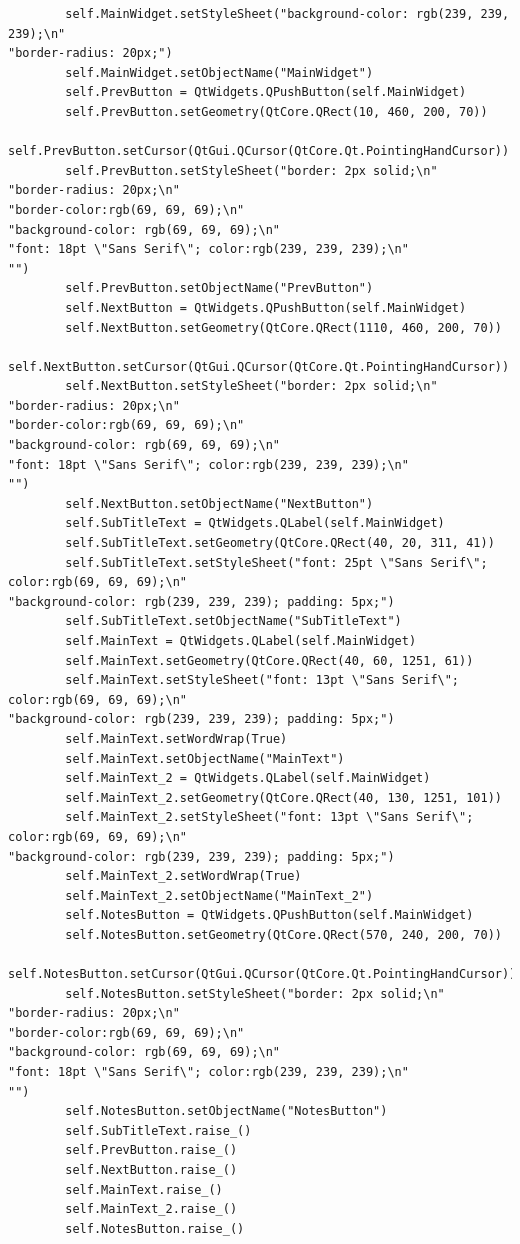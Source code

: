 \documentclass[12pt]{article}
\begin{document}
\begin{lstlisting}
        self.MainWidget.setStyleSheet("background-color: rgb(239, 239, 239);\n"
"border-radius: 20px;")
        self.MainWidget.setObjectName("MainWidget")
        self.PrevButton = QtWidgets.QPushButton(self.MainWidget)
        self.PrevButton.setGeometry(QtCore.QRect(10, 460, 200, 70))
        self.PrevButton.setCursor(QtGui.QCursor(QtCore.Qt.PointingHandCursor))
        self.PrevButton.setStyleSheet("border: 2px solid;\n"
"border-radius: 20px;\n"
"border-color:rgb(69, 69, 69);\n"
"background-color: rgb(69, 69, 69);\n"
"font: 18pt \"Sans Serif\"; color:rgb(239, 239, 239);\n"
"")
        self.PrevButton.setObjectName("PrevButton")
        self.NextButton = QtWidgets.QPushButton(self.MainWidget)
        self.NextButton.setGeometry(QtCore.QRect(1110, 460, 200, 70))
        self.NextButton.setCursor(QtGui.QCursor(QtCore.Qt.PointingHandCursor))
        self.NextButton.setStyleSheet("border: 2px solid;\n"
"border-radius: 20px;\n"
"border-color:rgb(69, 69, 69);\n"
"background-color: rgb(69, 69, 69);\n"
"font: 18pt \"Sans Serif\"; color:rgb(239, 239, 239);\n"
"")
        self.NextButton.setObjectName("NextButton")
        self.SubTitleText = QtWidgets.QLabel(self.MainWidget)
        self.SubTitleText.setGeometry(QtCore.QRect(40, 20, 311, 41))
        self.SubTitleText.setStyleSheet("font: 25pt \"Sans Serif\"; color:rgb(69, 69, 69);\n"
"background-color: rgb(239, 239, 239); padding: 5px;")
        self.SubTitleText.setObjectName("SubTitleText")
        self.MainText = QtWidgets.QLabel(self.MainWidget)
        self.MainText.setGeometry(QtCore.QRect(40, 60, 1251, 61))
        self.MainText.setStyleSheet("font: 13pt \"Sans Serif\"; color:rgb(69, 69, 69);\n"
"background-color: rgb(239, 239, 239); padding: 5px;")
        self.MainText.setWordWrap(True)
        self.MainText.setObjectName("MainText")
        self.MainText_2 = QtWidgets.QLabel(self.MainWidget)
        self.MainText_2.setGeometry(QtCore.QRect(40, 130, 1251, 101))
        self.MainText_2.setStyleSheet("font: 13pt \"Sans Serif\"; color:rgb(69, 69, 69);\n"
"background-color: rgb(239, 239, 239); padding: 5px;")
        self.MainText_2.setWordWrap(True)
        self.MainText_2.setObjectName("MainText_2")
        self.NotesButton = QtWidgets.QPushButton(self.MainWidget)
        self.NotesButton.setGeometry(QtCore.QRect(570, 240, 200, 70))
        self.NotesButton.setCursor(QtGui.QCursor(QtCore.Qt.PointingHandCursor))
        self.NotesButton.setStyleSheet("border: 2px solid;\n"
"border-radius: 20px;\n"
"border-color:rgb(69, 69, 69);\n"
"background-color: rgb(69, 69, 69);\n"
"font: 18pt \"Sans Serif\"; color:rgb(239, 239, 239);\n"
"")
        self.NotesButton.setObjectName("NotesButton")
        self.SubTitleText.raise_()
        self.PrevButton.raise_()
        self.NextButton.raise_()
        self.MainText.raise_()
        self.MainText_2.raise_()
        self.NotesButton.raise_()


\end{lstlisting}
\end{document}
